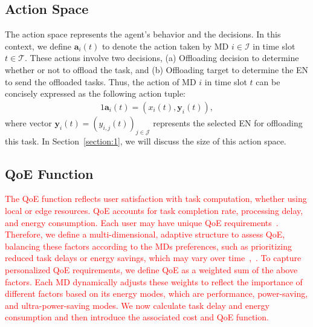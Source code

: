 \documentclass[10pt, journal,letterpaper]{IEEEtran}
\begin{document}
\subsection{Action Space}
The action space represents the agent's behavior and the decisions. In this context, we define $\boldsymbol{a}_i(t)$ to denote the action taken by MD $i \in \mathcal{I}$ in time slot $t \in \mathcal{T}$. These actions involve two decisions, (a) Offloading decision to determine whether or not to offload the task, and (b) Offloading target to determine the EN to send the offloaded tasks. Thus, the action of MD $i$ in time slot $t$ can be concisely expressed as the following action tuple: \vspace{-1.5mm}
\begin{alignat}{1}
	\boldsymbol{a}_i(t) = (x_i(t), \boldsymbol{y}_i(t)),
	\label{20}
\end{alignat}
where vector $\boldsymbol{y}_i(t)=(y_{i,j}(t))_{j \in \mathcal{J}}$ represents the selected EN for offloading this task. In Section~\ref{section:1}, we will discuss the size of this action space.




\subsection{QoE Function}
\textcolor{red}{The QoE function reflects user satisfaction with task computation, whether using local or edge resources. QoE accounts for task completion rate, processing delay, and energy consumption. Each user may have unique QoE requirements~\cite{wang2017qoe}. Therefore, we define a multi-dimensional, adaptive structure to assess QoE, balancing these factors according to the MDs preferences, such as prioritizing reduced task delays or energy savings, which may vary over time~\cite{wang2019intelligent},~\cite{mehrabi2019energy}. To capture personalized QoE requirements, we define QoE as a weighted sum of the above factors. Each MD dynamically adjusts these weights to reflect the importance of different factors based on its energy modes, which are performance, power-saving, and ultra-power-saving modes. We now calculate task delay and energy consumption and then introduce the associated cost and QoE function.}
\end{document}
